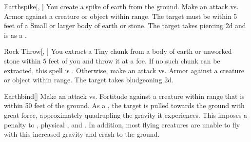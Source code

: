 \lowercase{\hypertarget{spell:Earthspike}{}}\label{spell:Earthspike}
\begin{ability}[\nth{1}]{\hypertarget{spell:Earthspike}{Earthspike}}[, ]
You create a spike of earth from the ground.
Make an attack vs. Armor against a creature or object within \rngclose range.
The target must be within 5 feet of a Small or larger body of earth or stone.
\hit The target takes piercing  \plus2d and is  as a .
\end{ability}
\vspace{0.25em}



\lowercase{\hypertarget{spell:Rock Throw}{}}\label{spell:Rock Throw}
\begin{ability}[\nth{1}]{\hypertarget{spell:Rock Throw}{Rock Throw}}[, ]
You extract a Tiny chunk from a body of earth or unworked stone within 5 feet of you and throw it at a foe.
If no such chunk can be extracted, this spell is .
Otherwise, make an attack vs. Armor against a creature or object within \rngmed range.
\hit The target takes bludgeoning  \plus2d.
\end{ability}
\vspace{0.25em}



\lowercase{\hypertarget{spell:Earthbind}{}}\label{spell:Earthbind}
\begin{ability}[\nth{2}]{\hypertarget{spell:Earthbind}{Earthbind}}[]
Make an attack vs. Fortitude against a creature within \rngmed range that is within 50 feet of the ground.
\hit As a , the target is pulled towards the ground with great force, approximately quadrupling the gravity it experiences.
This imposes a  penalty to , physical , and .
In addition, most flying creatures are unable to fly with this increased gravity and crash to the ground.
\end{ability}
\vspace{0.25em}



